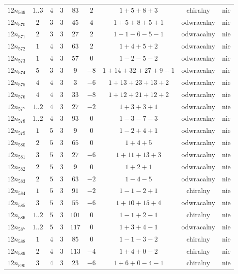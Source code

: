 \begin{longtable}{ccccccccc}
$12n_{569}$ & $1..3$ & $4$ & $3$ & $83$ & $2$ & $1+5+8+3$ & chiralny & nie \\
$12n_{570}$ & $2$ & $3$ & $3$ & $45$ & $4$ & $1+5+8+5+1$ & odwracalny & nie \\
$12n_{571}$ & $2$ & $3$ & $3$ & $27$ & $2$ & $1-1-6-5-1$ & odwracalny & nie \\
$12n_{572}$ & $1$ & $4$ & $3$ & $63$ & $2$ & $1+4+5+2$ & odwracalny & nie \\
$12n_{573}$ & $1$ & $4$ & $3$ & $57$ & $0$ & $1-2-5-2$ & odwracalny & nie \\
$12n_{574}$ & $5$ & $3$ & $3$ & $9$ & $-8$ & $1+14+32+27+9+1$ & odwracalny & nie \\
$12n_{575}$ & $4$ & $4$ & $3$ & $3$ & $-6$ & $1+13+23+13+2$ & odwracalny & nie \\
$12n_{576}$ & $4$ & $4$ & $3$ & $33$ & $-8$ & $1+12+21+12+2$ & odwracalny & nie \\
$12n_{577}$ & $1..2$ & $4$ & $3$ & $27$ & $-2$ & $1+3+3+1$ & odwracalny & nie \\
$12n_{578}$ & $1..2$ & $4$ & $3$ & $93$ & $0$ & $1-3-7-3$ & odwracalny & nie \\
$12n_{579}$ & $1$ & $5$ & $3$ & $9$ & $0$ & $1-2+4+1$ & odwracalny & nie \\
$12n_{580}$ & $2$ & $5$ & $3$ & $65$ & $0$ & $1+4+5$ & odwracalny & nie \\
$12n_{581}$ & $3$ & $5$ & $3$ & $27$ & $-6$ & $1+11+13+3$ & odwracalny & nie \\
$12n_{582}$ & $2$ & $5$ & $3$ & $9$ & $0$ & $1+2+1$ & odwracalny & nie \\
$12n_{583}$ & $2$ & $5$ & $3$ & $63$ & $-2$ & $1-4-5$ & odwracalny & nie \\
$12n_{584}$ & $1$ & $5$ & $3$ & $91$ & $-2$ & $1-1-2+1$ & chiralny & nie \\
$12n_{585}$ & $3$ & $5$ & $3$ & $55$ & $-6$ & $1+10+15+4$ & odwracalny & nie \\
$12n_{586}$ & $1..2$ & $5$ & $3$ & $101$ & $0$ & $1-1+2-1$ & chiralny & nie \\
$12n_{587}$ & $1..2$ & $5$ & $3$ & $117$ & $0$ & $1+3+4-1$ & odwracalny & nie \\
$12n_{588}$ & $1$ & $4$ & $3$ & $85$ & $0$ & $1-1-3-2$ & chiralny & nie \\
$12n_{589}$ & $2$ & $4$ & $3$ & $113$ & $-4$ & $1+4+0-2$ & chiralny & nie \\
$12n_{590}$ & $3$ & $4$ & $3$ & $23$ & $-6$ & $1+6+0-4-1$ & chiralny & nie \\

\end{longtable}
